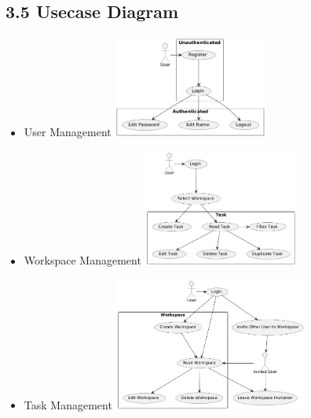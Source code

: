 \subsection*{3.5 Usecase Diagram}
\begin{itemize}
  \item User Management
  \newline
  \includegraphics[width=0.4\textwidth]{assets/usecase_diagrams/auth.png}
  \item Workspace Management
  \newline
  \includegraphics[width=0.4\textwidth]{assets/usecase_diagrams/workspace.png}
  \item Task Management
  \newline
  \includegraphics[width=0.5\textwidth]{assets/usecase_diagrams/task.png}
\end{itemize}

